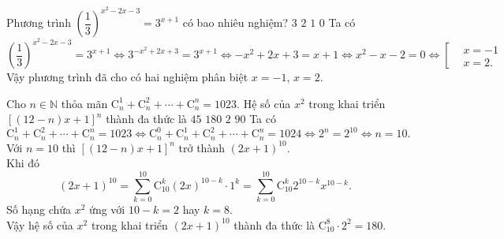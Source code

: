 \begin{ex}%
	Phương trình $\left(\dfrac{1}{3}\right)^{x^2-2x-3}=3^{x+1}$ có bao nhiêu nghiệm?
	\choice
	{$3$}
	{\True $2$}
	{$1$}
	{$0$}
	\loigiai
	{
		Ta có
		\[\left(\dfrac{1}{3}\right)^{x^2-2x-3}=3^{x+1} \Leftrightarrow 3^{-x^2+2x+3} = 3^{x+1} \Leftrightarrow -x^2+2x+3=x+1 \Leftrightarrow x^2-x-2=0 \Leftrightarrow \left[\begin{aligned}&x=-1 \\&x=2.\end{aligned}\right.\]
		Vậy phương trình đã cho có hai nghiệm phân biệt $x=-1$, $x=2$.
	}
\end{ex}

\begin{ex}%
	Cho $n\in\mathbb{N}$ thỏa mãn $\mathrm{C}_n^1+\mathrm{C}_n^2+\cdots + \mathrm{C}_n^n=1023$. Hệ số của $x^2$ trong khai triển $\left[(12-n)x+1\right]^n$ thành đa thức là
	\choice
	{$45$}
	{\True $180$}
	{$2$}
	{$90$}
	\loigiai
	{
		Ta có
		\[\mathrm{C}_n^1+\mathrm{C}_n^2+\cdots + \mathrm{C}_n^n=1023 \Leftrightarrow \mathrm{C}_n^0+\mathrm{C}_n^1+\mathrm{C}_n^2+\cdots + \mathrm{C}_n^n=1024 \Leftrightarrow 2^n=2^{10} \Leftrightarrow n=10.\]
		Với $n=10$ thì $\left[(12-n)x+1\right]^n$ trở thành $(2x+1)^{10}$.\\
		Khi đó
		\[(2x+1)^{10} = \sum\limits_{k=0}^{10}\mathrm{C}_{10}^k (2x)^{10-k}\cdot 1^k = \sum\limits_{k=0}^{10}\mathrm{C}_{10}^k 2^{10-k}x^{10-k}.\]
		Số hạng chứa $x^2$ ứng với $10-k=2$ hay $k=8$.\\
		Vậy hệ số của $x^2$ trong khai triển $(2x+1)^{10}$ thành đa thức là $\mathrm{C}_{10}^8\cdot 2^2 = 180$.
	}
\end{ex}

